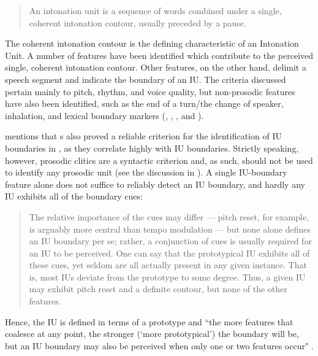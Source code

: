 \begin{quote}
	An intonation unit is a sequence of words combined under a single, coherent intonation contour, usually preceded by a pause. 	
\end{quote} 


The coherent intonation contour is the defining characteristic of an Intonation Unit. A number of  features have been identified which contribute to the  perceived single, coherent intonation contour. Other features, on the other hand,  delimit a speech segment and indicate the boundary of an IU.  The criteria discussed pertain mainly to pitch, rhythm, and voice quality, but non-prosodic features have also been identified, such as the end of a turn\slash the change of speaker, inhalation, and lexical boundary markers  (\citealt[93--155]{Schuetze-Coburn1994}, \citealt[260--270]{himmelmann2006challenges}, \citealt{dubois1992, dubois1993}, and \citealt[29--39]{cruttenden1997intonation}).


\citet[52]{Tao_1996} mentions that s also proved a reliable criterion for the identification of IU boundaries in , as they correlate highly with IU boundaries.
Strictly speaking, however, prosodic clitics are a syntactic criterion and, as such, should not be  used to identify any prosodic unit (see the discussion in  ). A single IU-boundary feature alone does not suffice to reliably detect an IU boundary, and hardly any IU exhibits all of the boundary cues:

\begin{quotation}
	The relative importance of the cues may differ --- pitch reset, for example, is arguably more central than tempo modulation --- but none alone defines an IU boundary per se; rather, a conjunction of cues is usually required for an IU to be perceived. One can say that the prototypical IU exhibits all of these cues, yet seldom are all actually present in any given instance. That is, most IUs deviate from the prototype to some degree. Thus, a given IU may exhibit pitch reset and a definite contour, but none of the other features. \citep[217]{Schuetze-Coburn1991}
\end{quotation}

Hence, the IU is defined in terms of a prototype and ``the more features that coalesce at any point, the stronger (‘more prototypical’) the boundary will be, but an IU boundary may also be perceived when only one or two features occur" \citep[227]{Schuetze-Coburn1991}.

